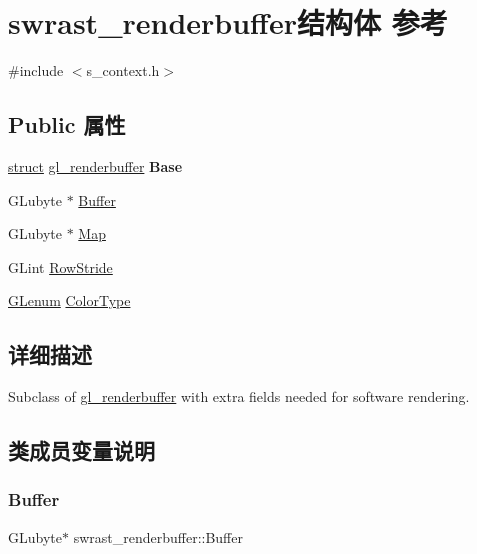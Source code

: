 \hypertarget{structswrast__renderbuffer}{}\section{swrast\+\_\+renderbuffer结构体 参考}
\label{structswrast__renderbuffer}


{\ttfamily \#include $<$s\+\_\+context.\+h$>$}

\subsection*{Public 属性}
\begin{DoxyCompactItemize}
\item 
\mbox{\label{structswrast__renderbuffer_a53183cdc37b6f35f5b35a68f8045e33a}} 
\hyperlink{interfacestruct}{struct} \hyperlink{structgl__renderbuffer}{gl\+\_\+renderbuffer} {\bfseries Base}
\item 
G\+Lubyte $\ast$ \hyperlink{structswrast__renderbuffer_a180d4663a51850203cd8fa1dcec29b32}{Buffer}
\item 
G\+Lubyte $\ast$ \hyperlink{structswrast__renderbuffer_a1e4aa5c61a3b986351d31b44f66dfd51}{Map}
\item 
G\+Lint \hyperlink{structswrast__renderbuffer_abc1ea97c94b96dd4cf54ee4c946662e8}{Row\+Stride}
\item 
\hyperlink{interfacevoid}{G\+Lenum} \hyperlink{structswrast__renderbuffer_a6e26ee9a792adc67a479573884e58aee}{Color\+Type}
\end{DoxyCompactItemize}


\subsection{详细描述}
Subclass of \hyperlink{structgl__renderbuffer}{gl\+\_\+renderbuffer} with extra fields needed for software rendering. 

\subsection{类成员变量说明}
\mbox{\label{structswrast__renderbuffer_a180d4663a51850203cd8fa1dcec29b32}} 
\subsubsection{\texorpdfstring{Buffer}{Buffer}}
{\footnotesize\ttfamily G\+Lubyte$\ast$ swrast\+\_\+renderbuffer\+::\+Buffer}

